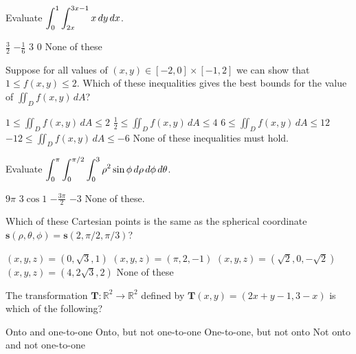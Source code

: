 \documentclass[12pt]{exam}
\newcommand{\ds}{\ensuremath{\displaystyle}}
\newcommand{\vect}[1]{\ensuremath{\mathbf{#1}}}
\newcommand{\<}{\langle}
\renewcommand{\>}{\rangle}
\newcommand{\dvar}{\,d}
\begin{document}
\begin{questions}

\setcounter{question}{0}
\question[20]
Evaluate \(\ds\int_0^1\int_{2x}^{3x-1}x\dvar y\dvar x\).


\begin{checkboxes}
\choice \(\frac{3}{2}\)
\choice \(-\frac{1}{6}\)
\choice \(3\)
\choice \(0\)
\choice None of these
\end{checkboxes}

\vfill

\question[20]
Suppose for all values of \((x,y)\in [-2,0]\times[-1,2]\) we can show that
\(1\leq f(x,y)\leq 2\). Which of these inequalities gives the best bounds
for the value of \(\iint_D f(x,y)\dvar A\)?

\begin{checkboxes}
\choice \(1\leq \iint_D f(x,y)\dvar A\leq 2\)
\choice \(\frac{1}{2}\leq \iint_D f(x,y)\dvar A\leq 4\)
\choice \(6\leq \iint_D f(x,y)\dvar A\leq 12\)
\choice \(-12\leq \iint_D f(x,y)\dvar A\leq -6\)
\choice None of these inequalities must hold.
\end{checkboxes}

\vfill
\newpage

\question[20]
Evaluate
\(
  \ds\int_0^\pi\int_0^{\pi/2}\int_0^3
    \rho^2\sin\phi
  \dvar\rho\dvar\phi\dvar\theta
\).

\begin{checkboxes}
\choice \(9\pi\)
\choice \(3\cos 1\)
\choice \(-\frac{3\pi}{2}\)
\choice \(-3\)
\choice None of these.
\end{checkboxes}

\vfill

\question[20]
Which of these Cartesian points is the same as the spherical coordinate
\(\vect s(\rho,\theta,\phi)=\vect s(2,\pi/2,\pi/3)\)?
\begin{checkboxes}
  \choice \((x,y,z)=(0,\sqrt3,1)\)
  \choice \((x,y,z)=(\pi,2,-1)\)
  \choice \((x,y,z)=(\sqrt 2,0,-\sqrt 2)\)
  \choice \((x,y,z)=(4,2\sqrt 3,2)\)
  \choice None of these
\end{checkboxes}

\vfill

\question[20]
The transformation \(\vect T:\mathbb R^2\to\mathbb R^2\) defined by
\(\vect T(x,y)=(2x+y-1,3-x)\) is which of the following?
\begin{checkboxes}
  \choice Onto and one-to-one
  \choice Onto, but not one-to-one
  \choice One-to-one, but not onto
  \choice Not onto and not one-to-one
\end{checkboxes}


\end{questions}
\end{document}
